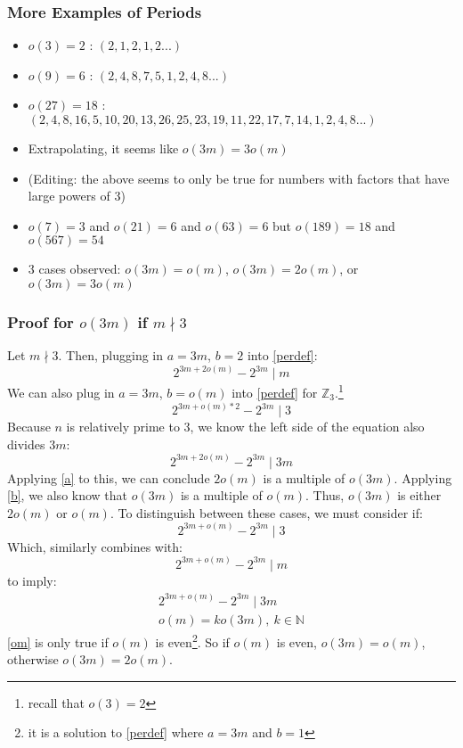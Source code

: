 \documentclass{article}
\begin{document}
  \subsubsection{More Examples of Periods}
  \begin{itemize}
  \item $o(3) = 2$ : $(2, 1, 2, 1, 2 ...)$
  \item $o(9) = 6$ : $(2, 4, 8, 7, 5, 1, 2, 4, 8 ...)$
  \item $o(27) = 18$ : $(2, 4, 8, 16, 5, 10, 20, 13, 26, 25, 23, 19, 11, 22, 17, 7, 14, 1, 2, 4, 8 ...)$
  \item Extrapolating, it seems like $o(3m) = 3o(m)$
  \item (Editing: the above seems to only be true for numbers with factors that have large powers of 3)
  \item $o(7) = 3$ and $o(21) = 6$ and $o(63) = 6$ but $o(189) = 18$ and $o(567) = 54$
  \item 3 cases observed: $o(3m) = o(m)$, $o(3m) = 2o(m)$, or $o(3m) = 3o(m)$
  \end{itemize}
  \subsubsection{Proof for  $o(3m)$ if $m \nmid 3$}
  Let $m \nmid 3$. Then, plugging in $a = 3m$, $b = 2$ into \eqref{perdef}:
  \begin{equation}
    2^{3m+2o(m)}-2^{3m}\mid m
  \end{equation}
  We can also plug in $a = 3m$, $b = o(m)$ into \eqref{perdef} for $\mathbb{Z}_3$.\footnote{recall that $o(3) = 2$}
  \begin{equation}
    2^{3m+o(m)*2}-2^{3m} \mid 3
  \end{equation}
  Because $n$ is relatively prime to 3, we know the left side of the equation also divides $3m$:
  \begin{equation}
    2^{3m+2o(m)} - 2^{3m} \mid 3m
  \end{equation}
  Applying \eqref{a} to this, we can conclude $2o(m)$ is a multiple of $o(3m)$. Applying \eqref{b}, we also know that $o(3m)$ is a multiple of $o(m)$. Thus, $o(3m)$ is either $2o(m)$ or $o(m)$. To distinguish between these cases, we must consider if:
  \begin{equation}\label{om}
    2^{3m + o(m)} - 2^{3m} \mid 3
  \end{equation}
  Which, similarly combines with:
  \begin{equation}
    2^{3m + o(m)} - 2^{3m} \mid m
  \end{equation}
  to imply:
  \begin{align}
    2^{3m + o(m)} - 2^{3m} \mid 3m \\
    o(m) = ko(3m),\  k \in \mathbb{N}
  \end{align}
  \eqref{om} is only true if $o(m)$ is even\footnote{it is a solution to \eqref{perdef} where $a = 3m$ and $b = 1$}. So if $o(m)$ is even, $o(3m) = o(m)$, otherwise $o(3m) = 2o(m)$.
\end{document}
